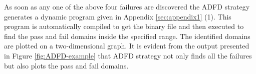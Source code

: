 As soon as any one of the above four failures are discovered the ADFD strategy generates a dynamic program given in Appendix \ref{sec:appendix1} (1). This program is automatically compiled to get the binary file and then executed to find the pass and fail domains inside the specified range. The identified domains are plotted on a two-dimensional graph. It is evident from the output presented in Figure \ref{fig:ADFD-example} that ADFD strategy not only finds all the failures but also plots the pass and fail domains.

